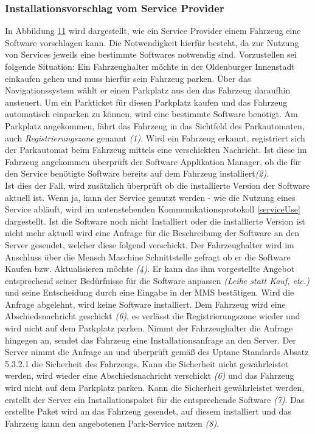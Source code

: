 \subsubsection{Installationsvorschlag vom Service Provider}\label{4.3.2}
In Abbildung \hyperref[img:installationsProtokollExtern]{11} wird dargestellt, wie ein Service Provider einem Fahrzeug eine Software vorschlagen kann. Die Notwendigkeit hierfür besteht, da zur Nutzung von Services jeweils eine bestimmte Softwares notwendig sind. Vorzustellen sei folgende Situation: Ein Fahrzeughalter möchte in der Oldenburger Innenstadt einkaufen gehen und muss hierfür sein Fahrzeug parken. Über das Navigationssystem wählt er einen Parkplatz aus den das Fahrzeug daraufhin ansteuert. Um ein Parkticket für diesen Parkplatz kaufen und das Fahrzeug automatisch einparken zu können, wird eine bestimmte Software benötigt. Am Parkplatz angekommen, fährt das Fahrzeug in das Sichtfeld des Parkautomaten, auch \textit{Registrierungszone} genannt \textit{(1)}. Wird ein Fahrzeug erkannt, registriert sich der Parkautomat beim Fahrzeug mittels eine verschickten Nachricht. Ist diese im Fahrzeug angekommen überprüft der Software Applikation Manager, ob die für den Service benötigte Software bereits auf dem Fahrzeug installiert\textit{(2)}.\\
Ist dies der Fall, wird zusätzlich überprüft ob die installierte Version der Software aktuell ist. Wenn ja, kann der Service genutzt werden - wie die Nutzung eines Service abläuft, wird im untenstehenden Kommunikationsprotokoll \ref{serviceUse} dargestellt. Ist die Software noch nicht Installiert oder die installierte Version ist nicht mehr aktuell wird eine Anfrage für die Beschreibung der Software an den Server gesendet, welcher diese folgend verschickt. Der Fahrzeughalter wird im Anschluss über die Mensch Maschine Schnittstelle gefragt ob er die Software Kaufen bzw. Aktualisieren möchte \textit{(4)}. Er kann das ihm vorgestellte Angebot entsprechend seiner Bedürfnisse für die Software anpassen \textit{(Leihe statt Kauf, etc.)} und seine Entscheidung durch eine Eingabe in der MMS bestätigen. Wird die Anfrage abgelehnt, wird keine Software installiert. Dem Fahrzeug wird eine Abschiedsnachricht geschickt \textit{(6)}, es verlässt die Registrierungszone wieder und wird nicht auf dem Parkplatz parken. Nimmt der Fahrzeughalter die Anfrage hingegen an, sendet das Fahrzeug eine Installationsanfrage an den Server.  Der Server nimmt die Anfrage an und überprüft gemäß des Uptane Standards Absatz 5.3.2.1 \cite{uptaneDoc} die Sicherheit des Fahrzeugs. Kann die Sicherheit nicht gewährleistet werden, wird wieder eine Abschiedsnachricht verschickt \textit{(6)} und das Fahrzeug wird nicht auf dem Parkplatz parken. Kann die Sicherheit gewährleistet werden, erstellt der Server ein Installationspaket für die entsprechende Software \textit{(7)}. Das erstellte Paket wird an das Fahrzeug gesendet, auf diesem installiert und das Fahrzeug kann den angebotenen Park-Service nutzen \textit{(8)}. 
